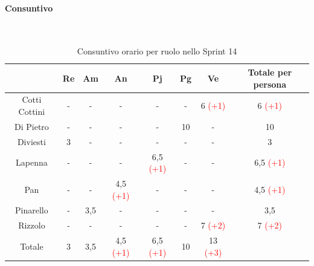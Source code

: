 \documentclass{article}
\begin{document}
                \paragraph{Consuntivo}\mbox{}\\
                \begin{table}[H]
                    \centering
                    \begin{tabular}{|c|c|c|c|c|c|c|c|}
                    \hline
                                  & Re  & Am  & An  & Pj  & Pg  & Ve  & Totale per persona \\ \hline
                    Cotti Cottini & -   & -   & -   & -   & -   & 6 \textcolor{red}{(+1)}   & 6 \textcolor{red}{(+1)}                  \\ \hline
                    Di Pietro     & -   & -   & -   & -   & 10  & -   & 10                 \\ \hline
                    Diviesti      & 3   & -   & -   & -   & -   & -   & 3                  \\ \hline
                    Lapenna       & -   & -   & -   & 6,5 \textcolor{red}{(+1)} & -   & -   & 6,5 \textcolor{red}{(+1)}               \\ \hline
                    Pan           & -   & -   & 4,5 \textcolor{red}{(+1)} & -   & -   & -   & 4,5 \textcolor{red}{(+1)}               \\ \hline
                    Pinarello     & -   & 3,5 & -   & -   & -   & -   & 3,5                \\ \hline
                    Rizzolo       & -   & -   & -   & -   & -   & 7 \textcolor{red}{(+2)}   & 7 \textcolor{red}{(+2)}                  \\ \hline
                    Totale        & 3   & 3,5 & 4,5 \textcolor{red}{(+1)} & 6,5 \textcolor{red}{(+1)} & 10  & 13 \textcolor{red}{(+3)}  &                    \\ \hline
                    \end{tabular}
                    \caption{Consuntivo orario per ruolo nello Sprint 14}
                \end{table}

\end{document}
